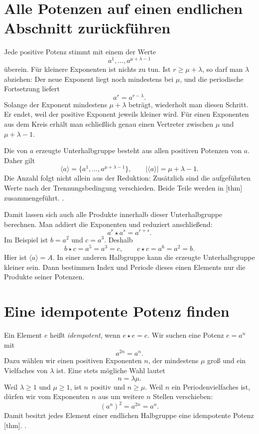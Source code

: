 \section*{Alle Potenzen auf einen endlichen Abschnitt zurückführen}

Jede positive Potenz stimmt mit einem der Werte
\[
 a^1,\ldots,a^{\mu+\lambda-1}
\]
überein. Für kleinere Exponenten ist nichts zu tun.
Ist \(r\geq\mu+\lambda\), so darf man \(\lambda\) abziehen:
Der neue Exponent liegt noch mindestens bei \(\mu\), und die
periodische Fortsetzung liefert
\[
 a^r=a^{r-\lambda}.
\]
Solange der Exponent mindestens \(\mu+\lambda\) beträgt, wiederholt
man diesen Schritt. Er endet, weil der positive Exponent jeweils
kleiner wird. Für einen Exponenten aus dem Kreis erhält man
schließlich genau einen Vertreter zwischen \(\mu\) und
\(\mu+\lambda-1\).

Die von \(a\) erzeugte Unterhalbgruppe besteht aus allen positiven
Potenzen von \(a\). Daher gilt
\[
 \langle a\rangle
 =\{a^1,\ldots,a^{\mu+\lambda-1}\},
 \qquad
 \boxed{|\langle a\rangle|=\mu+\lambda-1.}
\]
Die Anzahl folgt nicht allein aus der Reduktion: Zusätzlich sind
die aufgeführten Werte nach der Trennungsbedingung verschieden.
Beide Teile werden in
[thm] zusammengeführt.
.

Damit lassen sich auch alle Produkte innerhalb dieser Unterhalbgruppe
berechnen. Man addiert die Exponenten und reduziert anschließend:
\[
 a^r\star a^s=a^{r+s}.
\]
Im Beispiel ist \(b=a^2\) und \(c=a^3\). Deshalb
\[
 b\star c=a^5=a^3=c,\qquad c\star c=a^6=a^2=b.
\]
Hier ist \(\langle a\rangle=A\).
In einer anderen Halbgruppe kann die erzeugte Unterhalbgruppe kleiner
sein. Dann bestimmen Index und Periode dieses einen Elements nur
die Produkte seiner Potenzen.

\section*{Eine idempotente Potenz finden}

Ein Element \(e\) heißt \emph{idempotent}, wenn \(e\star e=e\).
Wir suchen eine Potenz \(e=a^n\) mit
\[
 a^{2n}=a^n.
\]
Dazu wählen wir einen positiven Exponenten \(n\), der mindestens
\(\mu\) groß und ein Vielfaches von \(\lambda\) ist.
Eine stets mögliche Wahl lautet
\[
 n=\lambda\mu.
\]
Weil \(\lambda\geq1\) und \(\mu\geq1\), ist \(n\) positiv
und \(n\geq\mu\). Weil \(n\) ein Periodenvielfaches ist, dürfen
wir vom Exponenten \(n\) aus um weitere \(n\) Stellen verschieben:
\[
 (a^n)^2=a^{2n}=a^n.
\]
Damit besitzt jedes Element einer endlichen Halbgruppe eine
idempotente Potenz
[thm].
.

